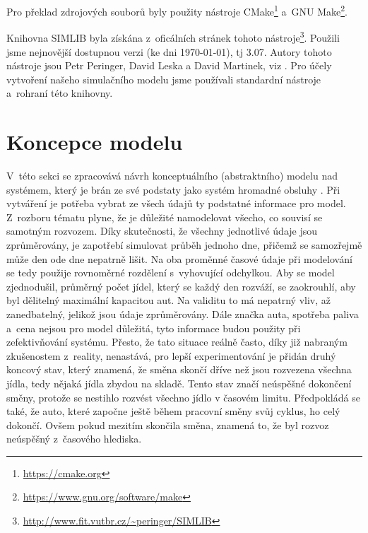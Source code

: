 \documentclass[a4paper, 11pt]{article}
\begin{document}
	Pro překlad zdrojových souborů byly použity nástroje
	CMake\footnote{\url{https://cmake.org}}
	a~GNU Make\footnote{\url{https://www.gnu.org/software/make}}.

	Knihovna SIMLIB byla získána z~oficálních stránek tohoto
	nástroje\footnote{\url{http://www.fit.vutbr.cz/~peringer/SIMLIB}}.
	Použili jsme nejnovější dostupnou verzi (ke dni \today), tj 3.07.
	Autory tohoto nástroje jsou Petr Peringer, David Leska a David Martinek,
	viz \cite{SIMLIB}. Pro účely vytvoření našeho simulačního modelu
	\cite[snímek 44]{IMS_slides} jsme používali standardní nástroje
	a~rohraní této knihovny.



	\section{Koncepce modelu}

	V~této sekci se zpracovává návrh konceptuálního (abstraktního) modelu
	\cite[snímek 48]{IMS_slides} nad systémem, který je brán ze své podstaty
	jako systém hromadné obsluhy \cite[snímek 136]{IMS_slides}. Při vytváření
	je potřeba vybrat ze všech údajů ty podstatné informace pro model.
	Z~rozboru tématu plyne, že je důležité namodelovat všecho, co souvisí se
	samotným rozvozem. Díky skutečnosti, že všechny jednotlivé údaje jsou
	zprůměrovány, je zapotřebí simulovat průběh jednoho dne, přičemž se
	samozřejmě může den ode dne nepatrně lišit.	Na oba proměnné časové údaje
	při modelování se tedy použije rovnoměrné rozdělení
	\cite[snímek 89]{IMS_slides} s~vyhovující odchylkou. Aby se model
	zjednodušil, průměrný počet jídel, který se každý den rozváží, se
	zaokrouhlí, aby byl dělitelný maximální kapacitou aut. Na validitu to má
	nepatrný vliv, až zanedbatelný, jelikož jsou údaje zprůměrovány. Dále
	značka auta, spotřeba paliva a~cena nejsou pro model důležitá, tyto
	informace budou použity při zefektivňování systému. Přesto, že tato
	situace reálně často, díky již nabraným zkušenostem z~reality, nenastává,
	pro lepší experimentování je přidán druhý koncový stav, který znamená,
	že směna skončí dříve než jsou rozvezena všechna jídla, tedy nějaká
	jídla zbydou na skladě. Tento stav značí neúspěšné dokončení směny,
	protože se nestihlo rozvést všechno jídlo v časovém limitu. Předpokládá se
	také, že auto, které započne ještě během pracovní směny svůj cyklus, ho
	celý dokončí. Ovšem pokud mezitím skončila směna, znamená to, že byl
	rozvoz neúspěšný z~časového hlediska.
\end{document}
